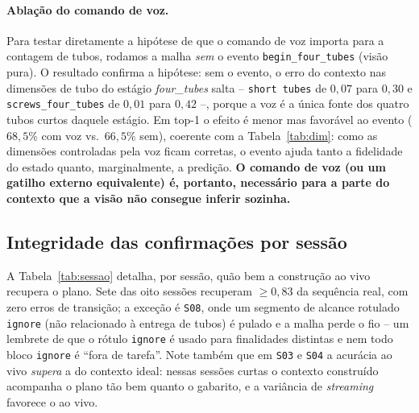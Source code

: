\documentclass[11pt]{article}
\begin{document}
\paragraph{Ablação do comando de voz.} Para testar diretamente a hipótese de que
o comando de voz importa para a contagem de tubos, rodamos a malha \emph{sem} o
evento \texttt{begin\_four\_tubes} (visão pura). O resultado confirma a hipótese:
sem o evento, o erro do contexto nas dimensões de tubo do estágio
\emph{four\_tubes} salta -- \texttt{short tubes} de $0{,}07$ para $0{,}30$ e
\texttt{screws\_four\_tubes} de $0{,}01$ para $0{,}42$ --, porque a voz é a única
fonte dos quatro tubos curtos daquele estágio. Em top-1 o efeito é menor mas
favorável ao evento ($68{,}5\%$ com voz vs.\ $66{,}5\%$ sem), coerente com a
Tabela~\ref{tab:dim}: como as dimensões controladas pela voz ficam corretas, o
evento ajuda tanto a fidelidade do estado quanto, marginalmente, a predição.
\textbf{O comando de voz (ou um gatilho externo equivalente) é, portanto,
necessário para a parte do contexto que a visão não consegue inferir sozinha.}

\subsection{Integridade das confirmações por sessão}
\label{sec:integridade}

A Tabela~\ref{tab:sessao} detalha, por sessão, quão bem a construção ao vivo
recupera o plano. Sete das oito sessões recuperam $\ge 0{,}83$ da sequência real,
com zero erros de transição; a exceção é \texttt{S08}, onde um segmento de
alcance rotulado \texttt{ignore} (não relacionado à entrega de tubos) é pulado e
a malha perde o fio -- um lembrete de que o rótulo \texttt{ignore} é usado para
finalidades distintas e nem todo bloco \texttt{ignore} é ``fora de tarefa''.
Note também que em \texttt{S03} e \texttt{S04} a acurácia ao vivo \emph{supera} a
do contexto ideal: nessas sessões curtas o contexto construído acompanha o plano
tão bem quanto o gabarito, e a variância de \emph{streaming} favorece o ao vivo.
\end{document}
